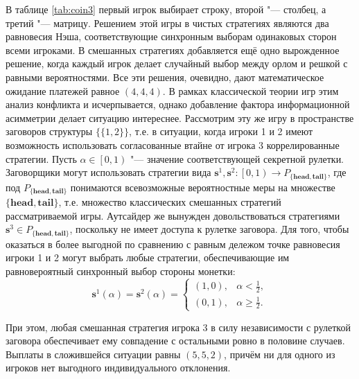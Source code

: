 В таблице \ref{tab:coin3} первый игрок выбирает строку, второй "--- столбец, а третий "--- матрицу. Решением этой игры в чистых стратегиях являются два равновесия Нэша, соответствующие синхронным выборам одинаковых сторон всеми игроками. В смешанных стратегиях добавляется ещё одно вырожденное решение, когда каждый игрок делает случайный выбор между орлом и решкой с равными вероятностями. Все эти решения, очевидно, дают математическое ожидание платежей равное $(4,4,4)$. В рамках классической теории игр этим анализ конфликта и исчерпывается, однако добавление фактора информационной асимметрии делает ситуацию интереснее. Рассмотрим эту же игру в пространстве заговоров структуры $\{\{1,2\}\}$, т.е. в ситуации, когда игроки 1 и 2 имеют возможность использовать согласованные втайне от игрока 3 коррелированные стратегии. Пусть $\alpha \in \left[0, 1\right)$ "--- значение соответствующей секретной рулетки. Заговорщики могут использовать стратегии вида $\mathbf{s}^1, \mathbf{s}^2 : \left[0, 1\right) \rightarrow P_{\{\mathbf{head}, \mathbf{tail}\}}$, где под $P_{\{\mathbf{head}, \mathbf{tail}\}}$ понимаются всевозможные вероятностные меры на множестве $\{\mathbf{head}, \mathbf{tail}\}$, т.е. множество классических смешанных стратегий рассматриваемой игры. Аутсайдер же вынужден довольствоваться стратегиями $\mathbf{s}^3 \in P_{\{\mathbf{head}, \mathbf{tail}\}}$, поскольку не имеет доступа к рулетке заговора. Для того, чтобы оказаться в более выгодной по сравнению с равным дележом точке равновесия игроки 1 и 2 могут выбрать любые стратегии, обеспечивающие им равновероятный синхронный выбор стороны монетки:
\begin{equation*}
	\mathbf{s}^1(\alpha) = \mathbf{s}^2(\alpha) = \begin{cases}
		(1, 0), & \alpha < \frac{1}{2},\\
		(0, 1), & \alpha \ge \frac{1}{2}.
	\end{cases}
\end{equation*}

При этом, любая смешанная стратегия игрока 3 в силу независимости с рулеткой заговора обеспечивает ему совпадение с остальными ровно в половине случаев. Выплаты в сложившейся ситуации равны $(5,5,2)$, причём ни для одного из игроков нет выгодного индивидуального отклонения.

\FloatBarrier
